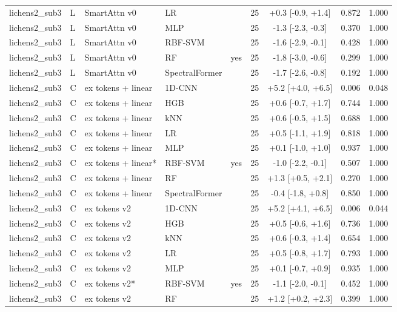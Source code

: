 \begin{tabular}{lllllcccc}
lichens2_sub3 & L & SmartAttn v0 & LR &  & 25 & +0.3 [-0.9, +1.4] & 0.872 & 1.000 \\
lichens2_sub3 & L & SmartAttn v0 & MLP &  & 25 & -1.3 [-2.3, -0.3] & 0.370 & 1.000 \\
lichens2_sub3 & L & SmartAttn v0 & RBF-SVM &  & 25 & -1.6 [-2.9, -0.1] & 0.428 & 1.000 \\
lichens2_sub3 & L & SmartAttn v0 & RF & yes & 25 & -1.8 [-3.0, -0.6] & 0.299 & 1.000 \\
lichens2_sub3 & L & SmartAttn v0 & SpectralFormer &  & 25 & -1.7 [-2.6, -0.8] & 0.192 & 1.000 \\
lichens2_sub3 & C & ex tokens + linear & 1D-CNN &  & 25 & +5.2 [+4.0, +6.5] & 0.006 & 0.048 \\
lichens2_sub3 & C & ex tokens + linear & HGB &  & 25 & +0.6 [-0.7, +1.7] & 0.744 & 1.000 \\
lichens2_sub3 & C & ex tokens + linear & kNN &  & 25 & +0.6 [-0.5, +1.5] & 0.688 & 1.000 \\
lichens2_sub3 & C & ex tokens + linear & LR &  & 25 & +0.5 [-1.1, +1.9] & 0.818 & 1.000 \\
lichens2_sub3 & C & ex tokens + linear & MLP &  & 25 & +0.1 [-1.0, +1.0] & 0.937 & 1.000 \\
lichens2_sub3 & C & ex tokens + linear* & RBF-SVM & yes & 25 & -1.0 [-2.2, -0.1] & 0.507 & 1.000 \\
lichens2_sub3 & C & ex tokens + linear & RF &  & 25 & +1.3 [+0.5, +2.1] & 0.270 & 1.000 \\
lichens2_sub3 & C & ex tokens + linear & SpectralFormer &  & 25 & -0.4 [-1.8, +0.8] & 0.850 & 1.000 \\
lichens2_sub3 & C & ex tokens v2 & 1D-CNN &  & 25 & +5.2 [+4.1, +6.5] & 0.006 & 0.044 \\
lichens2_sub3 & C & ex tokens v2 & HGB &  & 25 & +0.5 [-0.6, +1.6] & 0.736 & 1.000 \\
lichens2_sub3 & C & ex tokens v2 & kNN &  & 25 & +0.6 [-0.3, +1.4] & 0.654 & 1.000 \\
lichens2_sub3 & C & ex tokens v2 & LR &  & 25 & +0.5 [-0.8, +1.7] & 0.793 & 1.000 \\
lichens2_sub3 & C & ex tokens v2 & MLP &  & 25 & +0.1 [-0.7, +0.9] & 0.935 & 1.000 \\
lichens2_sub3 & C & ex tokens v2* & RBF-SVM & yes & 25 & -1.1 [-2.0, -0.1] & 0.452 & 1.000 \\
lichens2_sub3 & C & ex tokens v2 & RF &  & 25 & +1.2 [+0.2, +2.3] & 0.399 & 1.000 \\

\end{tabular}
